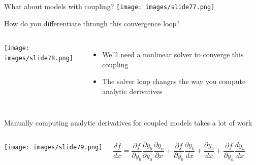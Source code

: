 \documentclass[aspectratio=169, usenames, dvipsnames, 14pt]{beamer}
\begin{document}

 \begin{frame}{What about models with coupling?}
 \centering
 \texttt{[image: images/slide77.png]}
 
 \end{frame}


 \begin{frame}{How do you differentiate through this convergence loop? }
 \begin{columns}
         \texttt{[image: images/slide78.png]}
 
         \begin{itemize}
             \item We'll need a nonlinear solver to converge this coupling
             \vspace{0.5cm}
             \item The solver loop changes the way you compute analytic derivatives
         \end{itemize}
 \end{columns}
 
 \end{frame}

 \begin{frame}{Manually computing analytic derivatives for coupled models takes a lot of work}
 \begin{columns}
         \texttt{[image: images/slide79.png]}
 
 
        \begin{equation*}
             \frac{df}{dx} = \frac{\partial f}{\partial y_{b}} \frac{\partial y_{b}}{\partial y_{a}} \frac{\partial y_{a}}{\partial x} + \frac{\partial f}{\partial y_{b}} \frac{\partial y_{b}}{dx} + \frac{\partial y_{b}}{dx} + \frac{\partial f}{\partial y_{a}} \frac{dy_{a}}{dx}
         \end{equation*}
 \end{columns}
 
 \end{frame}
\end{document}
